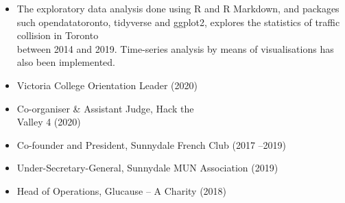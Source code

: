 \smallskip


\begin{itemize}
    \item The exploratory data analysis done using R and R Markdown, and packages such opendatatoronto, tidyverse and ggplot2, explores the statistics of traffic collision in Toronto \\between 2014 and 2019. Time-series analysis by means of visualisations has also been implemented.
\end{itemize}


\begin{itemize}
    \item Victoria  College  Orientation  Leader  (2020)
    \item Co-organiser  \&  Assistant  Judge,  Hack  the \\ Valley  4  (2020)
    \item Co-founder  and  President, Sunnydale French Club (2017 –2019)
    \item Under-Secretary-General, Sunnydale MUN Association (2019)
    \item Head of Operations, Glucause – A Charity (2018)
    
\end{itemize}

\cvproject{}